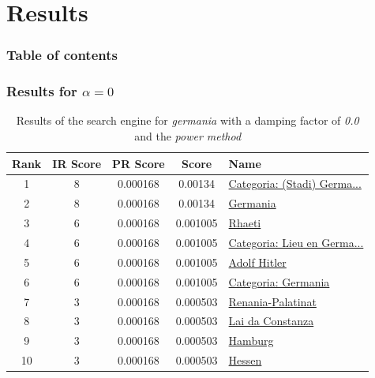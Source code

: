 \documentclass[10pt]{beamer}
\begin{document}

\section{Results}

\begin{frame}
  \frametitle{Table of contents}
  \tableofcontents[currentsection]
\end{frame}

\begin{frame}
  \frametitle{Results for $\alpha = 0$}
  \begin{table}
    \begin{tabular}{ | c | c | c | c | l | }
      \hline
      Rank & IR Score & PR Score &  Score & Name \\ \hline
      1 & 8 & 0.000168 & 0.00134 & \href{http://rm.wikipedia.org/wiki/Categoria:(Stadi)_Germania}{Categoria: (Stadi) Germa...} \\ \hline
      2 & 8 & 0.000168 & 0.00134 & \href{http://rm.wikipedia.org/wiki/Germania}{Germania} \\ \hline
      3 & 6 & 0.000168 & 0.001005 & \href{http://rm.wikipedia.org/wiki/Rhaeti}{Rhaeti} \\ \hline
      4 & 6 & 0.000168 & 0.001005 & \href{http://rm.wikipedia.org/wiki/Categoria:Lieu_en_Germania}{Categoria: Lieu en Germa...} \\ \hline
      5 & 6 & 0.000168 & 0.001005 & \href{http://rm.wikipedia.org/wiki/Adolf_Hitler}{Adolf Hitler} \\ \hline
      6 & 6 & 0.000168 & 0.001005 & \href{http://rm.wikipedia.org/wiki/Categoria:Germania}{Categoria: Germania} \\ \hline
      7 & 3 & 0.000168 & 0.000503 & \href{http://rm.wikipedia.org/wiki/Renania-Palatinat}{Renania-Palatinat} \\ \hline
      8 & 3 & 0.000168 & 0.000503 & \href{http://rm.wikipedia.org/wiki/Lai_da_Constanza}{Lai da Constanza} \\ \hline
      9 & 3 & 0.000168 & 0.000503 & \href{http://rm.wikipedia.org/wiki/Hamburg}{Hamburg} \\ \hline
      10 & 3 & 0.000168 & 0.000503 & \href{http://rm.wikipedia.org/wiki/Hessen}{Hessen} \\ \hline
    \end{tabular}
    \caption{Results of the search engine for \emph{germania} with a damping factor of \emph{0.0} and the \emph{power method}}
    \label{table_d=0.0}
  \end{table}
\end{frame}
\end{document}
